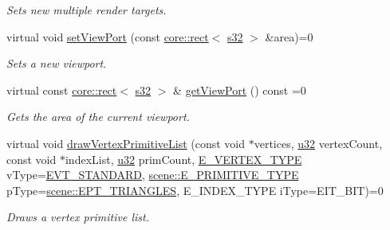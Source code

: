 \begin{DoxyCompactItemize}
\begin{DoxyCompactList}\small\item\em Sets new multiple render targets. \end{DoxyCompactList}\item 
virtual void \hyperlink{classirr_1_1video_1_1IVideoDriver_af03cf9b67bb7b43a8021bbe4baa78a08}{set\+View\+Port} (const \hyperlink{classirr_1_1core_1_1rect}{core\+::rect}$<$ \hyperlink{namespaceirr_ac66849b7a6ed16e30ebede579f9b47c6}{s32} $>$ \&area)=0
\begin{DoxyCompactList}\small\item\em Sets a new viewport. \end{DoxyCompactList}\item 
virtual const \hyperlink{classirr_1_1core_1_1rect}{core\+::rect}$<$ \hyperlink{namespaceirr_ac66849b7a6ed16e30ebede579f9b47c6}{s32} $>$ \& \hyperlink{classirr_1_1video_1_1IVideoDriver_aa21810374736559e937fcad30ac699b4}{get\+View\+Port} () const =0
\begin{DoxyCompactList}\small\item\em Gets the area of the current viewport. \end{DoxyCompactList}\item 
virtual void \hyperlink{classirr_1_1video_1_1IVideoDriver_ab18ac3ba8b6dbaa4437c5eb3b1e2f4fb}{draw\+Vertex\+Primitive\+List} (const void $\ast$vertices, \hyperlink{namespaceirr_a0416a53257075833e7002efd0a18e804}{u32} vertex\+Count, const void $\ast$index\+List, \hyperlink{namespaceirr_a0416a53257075833e7002efd0a18e804}{u32} prim\+Count, \hyperlink{namespaceirr_1_1video_a0e3b59e025e0d0db0ed2ee0ce904deac}{E\+\_\+\+V\+E\+R\+T\+E\+X\+\_\+\+T\+Y\+PE} v\+Type=\hyperlink{namespaceirr_1_1video_a0e3b59e025e0d0db0ed2ee0ce904deaca98c8b791280bbf9252c4f4a37e91a416}{E\+V\+T\+\_\+\+S\+T\+A\+N\+D\+A\+RD}, \hyperlink{namespaceirr_1_1scene_a5d7de82f2169761194b2f44d95cdc1dc}{scene\+::\+E\+\_\+\+P\+R\+I\+M\+I\+T\+I\+V\+E\+\_\+\+T\+Y\+PE} p\+Type=\hyperlink{namespaceirr_1_1scene_a5d7de82f2169761194b2f44d95cdc1dca237fc76e4b259febd27b4b84066ca581}{scene\+::\+E\+P\+T\+\_\+\+T\+R\+I\+A\+N\+G\+L\+ES}, E\+\_\+\+I\+N\+D\+E\+X\+\_\+\+T\+Y\+PE i\+Type=E\+I\+T\+\_\+B\+IT)=0
\begin{DoxyCompactList}\small\item\em Draws a vertex primitive list. \end{DoxyCompactList}\item 

\end{DoxyCompactItemize}
